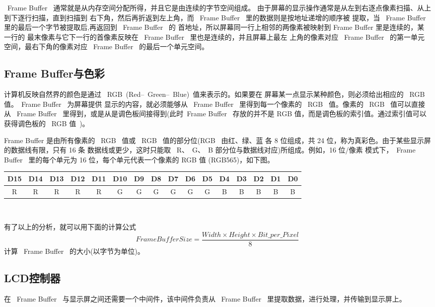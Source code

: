 	~Frame Buffer~ 通常就是从内存空间分配所得，并且它是由连续的字节空间组成。
由于屏幕的显示操作通常是从左到右逐点像素扫描、从上到下逐行扫描，直到扫描到
右下角，然后再折返到左上角，而 ~Frame Buffer~ 里的数据则是按地址递增的顺序被
提取，当 ~Frame Buffer~ 里的最后一个字节被提取后,再返回到 ~Frame Buffer~ 的
首地址，所以屏幕同一行上相邻的两像素被映射到 Frame Buffer 里是连续的，某一行的
最末像素与它下一行的首像素反映在 ~Frame Buffer~ 里也是连续的，并且屏幕上最左
上角的像素对应 ~Frame Buffer~ 的第一单元空间，最右下角的像素对应 ~Frame
Buffer~ 的最后一个单元空间。

\subsection{Frame Buffer与色彩}
	计算机反映自然界的颜色是通过 ~RGB~(Red--~Green--~Blue)~值来表示的。如果要在
屏幕某一点显示某种颜色，则必须给出相应的 ~RGB~ 值。~Frame Buffer~ 为屏幕提供
显示的内容，就必须能够从 ~Frame Buffer~ 里得到每一个像素的 ~RGB~ 值。像素的
~RGB~ 值可以直接从 ~Frame Buffer~ 里得到，或是从是调色板间接得到(此时~Frame
Buffer~ 存放的并不是 RGB 值，而是调色板的索引值。通过索引值可以获得调色板的
~RGB 值~)。

	Frame Buffer 是由所有像素的 ~RGB~ 值或 ~RGB~ 值的部分位(RGB~ 由红、绿、蓝
各 8 位组成，共 24 位，称为真彩色。由于某些显示屏的数据线有限，只有 16 条
数据线或更少，这时只能取 ~R、~G、~B 部分位与数据线对应)所组成。例如，16 位/像素
模式下，~Frame Buffer~ 里的每个单元为 16 位，每个单元代表一个像素的 RGB 值
(RGB565)，如下图。\\

\small
\begin{tabular}{|*{16}{c|}}
\hline
   D15 & D14 & D13 & D12 & D11 & D10 & D9 & D8 &
        D7 & D6 & D5 & D4 & D3 & D2 & D1 & D0\\\hline
  R & R & R & R & R & G & G & G & G & G & G & B & B & B & B & B\\\hline
\end{tabular}
\ \\
\normalsize

	有了以上的分析，就可以用下面的计算公式
$$
	FrameBufferSize=\frac{Width \times Height \times Bit\_per\_Pixel}{8}
$$
计算 ~Frame Buffer~ 的大小(以字节为单位)。

\subsection{LCD控制器}
	在 ~Frame Buffer~ 与显示屏之间还需要一个中间件，该中间件负责从 ~Frame
Buffer~ 里提取数据，进行处理，并传输到显示屏上。

